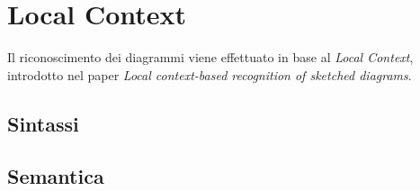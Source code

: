 \chapter{Local Context}\label{ch:chapter3}
    Il riconoscimento dei diagrammi viene effettuato in base al \textit{Local Context}, introdotto nel paper \textit{Local context-based recognition of sketched diagrams}\cite{localcontext_recognition}.
    \section{Sintassi}
    \section{Semantica}